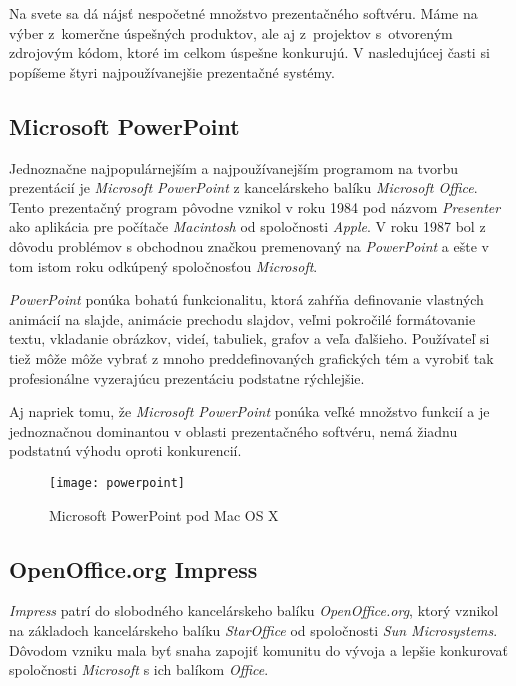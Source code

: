 Na svete sa dá nájsť nespočetné množstvo prezentačného softvéru. Máme na výber z~komerčne úspešných produktov, ale aj z~projektov s~otvoreným zdrojovým kódom, ktoré im celkom úspešne konkurujú. V nasledujúcej časti si popíšeme štyri najpoužívanejšie prezentačné systémy.

\subsection{Microsoft PowerPoint} \label{sec:powerpoint}

Jednoznačne najpopulárnejším a najpoužívanejším programom na tvorbu prezentácií je \textit{Microsoft PowerPoint} z kancelárskeho balíku \textit{Microsoft Office}. Tento prezentačný program pôvodne vznikol v roku 1984 pod názvom \textit{Presenter} ako aplikácia pre počítače \textit{Macintosh} od spoločnosti \textit{Apple}. V roku 1987 bol z dôvodu problémov s obchodnou značkou premenovaný na \textit{PowerPoint} a ešte v tom istom roku odkúpený spoločnosťou \textit{Microsoft}.

\textit{PowerPoint} ponúka bohatú funkcionalitu, ktorá zahŕňa definovanie vlastných animácií na slajde, animácie prechodu slajdov, veľmi pokročilé formátovanie textu, vkladanie obrázkov, videí, tabuliek, grafov a veľa ďalšieho. Používateľ si tiež môže môže vybrať z mnoho preddefinovaných grafických tém a vyrobiť tak profesionálne vyzerajúcu prezentáciu podstatne rýchlejšie.

Aj napriek tomu, že \textit{Microsoft PowerPoint} ponúka veľké množstvo funkcií a je jednoznačnou dominantou v oblasti prezentačného softvéru, nemá žiadnu podstatnú výhodu oproti konkurencií.

\begin{figure}
 \texttt{[image: powerpoint]}
 \caption{Microsoft PowerPoint pod Mac OS X\label{fig:powerpoint}}
\end{figure}

\subsection{OpenOffice.org Impress}

\textit{Impress} patrí do slobodného kancelárskeho balíku \textit{OpenOffice.org}, ktorý vznikol na základoch kancelárskeho balíku \textit{StarOffice} od spoločnosti \textit{Sun Microsystems}. Dôvodom vzniku mala byť snaha zapojiť komunitu do vývoja a lepšie konkurovať spoločnosti \textit{Microsoft} s ich balíkom \textit{Office}.

